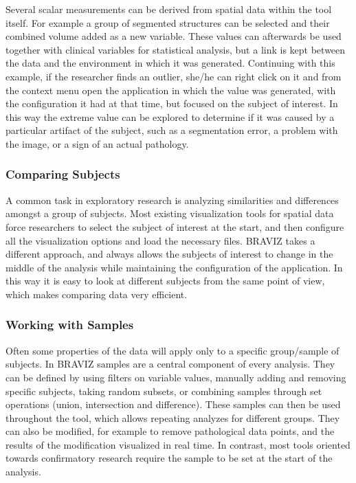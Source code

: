 \documentclass[twocolumn]{svjour3}
\begin{document}
Several scalar measurements can be derived from spatial data within the tool itself. For example a group of segmented structures can be selected and their combined volume added as a new variable. These values can afterwards be used together with clinical variables for statistical analysis, but a link is kept between the data and the environment in which it was generated. Continuing with this example, if the researcher finds an outlier, she/he can right click on it and from the context menu open the application in which the value was generated, with the configuration it had at that time, but focused on the subject of interest. In this way the extreme value can be explored to determine if it was caused by a particular artifact of the subject, such as a segmentation error, a problem with the image, or a sign of an actual pathology.

\subsubsection{Comparing Subjects}

A common task in exploratory research is analyzing similarities and differences amongst a group of subjects. Most existing visualization tools for spatial data force researchers to select the subject of interest at the start, and then configure all the visualization options and load the necessary files. BRAVIZ takes a different approach, and always allows the subjects of interest to change in the middle of the analysis while maintaining the configuration of the application. In this way it is easy to look at different subjects from the same point of view, which makes comparing data very efficient.  

\subsubsection{Working with Samples}
\label{subsamples}
Often some properties of the data will apply only to a specific group/sample of subjects. In BRAVIZ samples are a central component of every analysis. They can be defined by using filters on variable values, manually adding and removing specific subjects, taking random subsets, or combining samples through set operations (union, intersection and difference). These samples can then be used throughout the tool, which allows repeating analyzes for different groups. They can also be modified, for example to remove pathological data points, and the results of the modification visualized in real time. In contrast, most tools oriented towards confirmatory research require the sample to be set at the start of the analysis.
\end{document}
